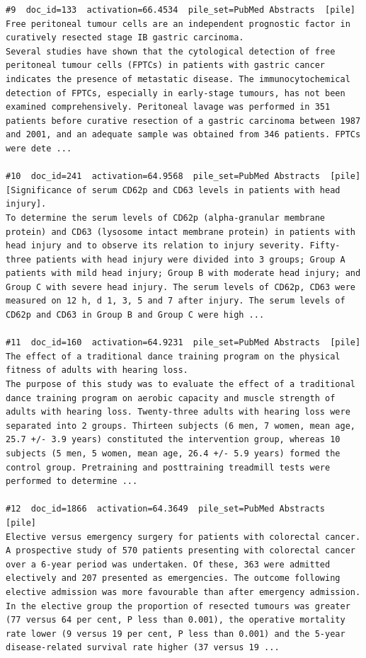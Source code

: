 \begin{verbatim}
#9  doc_id=133  activation=66.4534  pile_set=PubMed Abstracts  [pile]
Free peritoneal tumour cells are an independent prognostic factor in curatively resected stage IB gastric carcinoma.
Several studies have shown that the cytological detection of free peritoneal tumour cells (FPTCs) in patients with gastric cancer indicates the presence of metastatic disease. The immunocytochemical detection of FPTCs, especially in early-stage tumours, has not been examined comprehensively. Peritoneal lavage was performed in 351 patients before curative resection of a gastric carcinoma between 1987 and 2001, and an adequate sample was obtained from 346 patients. FPTCs were dete ...

#10  doc_id=241  activation=64.9568  pile_set=PubMed Abstracts  [pile]
[Significance of serum CD62p and CD63 levels in patients with head injury].
To determine the serum levels of CD62p (alpha-granular membrane protein) and CD63 (lysosome intact membrane protein) in patients with head injury and to observe its relation to injury severity. Fifty-three patients with head injury were divided into 3 groups; Group A patients with mild head injury; Group B with moderate head injury; and Group C with severe head injury. The serum levels of CD62p, CD63 were measured on 12 h, d 1, 3, 5 and 7 after injury. The serum levels of CD62p and CD63 in Group B and Group C were high ...

#11  doc_id=160  activation=64.9231  pile_set=PubMed Abstracts  [pile]
The effect of a traditional dance training program on the physical fitness of adults with hearing loss.
The purpose of this study was to evaluate the effect of a traditional dance training program on aerobic capacity and muscle strength of adults with hearing loss. Twenty-three adults with hearing loss were separated into 2 groups. Thirteen subjects (6 men, 7 women, mean age, 25.7 +/- 3.9 years) constituted the intervention group, whereas 10 subjects (5 men, 5 women, mean age, 26.4 +/- 5.9 years) formed the control group. Pretraining and posttraining treadmill tests were performed to determine ...

#12  doc_id=1866  activation=64.3649  pile_set=PubMed Abstracts  [pile]
Elective versus emergency surgery for patients with colorectal cancer.
A prospective study of 570 patients presenting with colorectal cancer over a 6-year period was undertaken. Of these, 363 were admitted electively and 207 presented as emergencies. The outcome following elective admission was more favourable than after emergency admission. In the elective group the proportion of resected tumours was greater (77 versus 64 per cent, P less than 0.001), the operative mortality rate lower (9 versus 19 per cent, P less than 0.001) and the 5-year disease-related survival rate higher (37 versus 19 ...


\end{verbatim}
